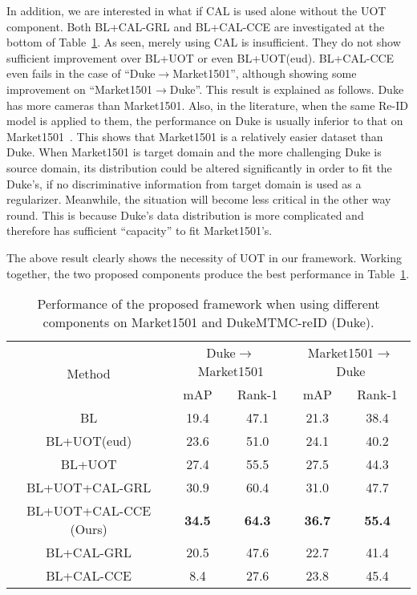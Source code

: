 \documentclass[10pt,twocolumn,letterpaper]{article}
\begin{document}
 
In addition, we are interested in what if CAL is used alone without the UOT component. Both BL+CAL-GRL and BL+CAL-CCE are investigated at the bottom of Table~\ref{tab02}. As seen, merely using CAL is insufficient. They do not show sufficient improvement over BL+UOT or even BL+UOT(eud). BL+CAL-CCE even fails in the case of ``Duke$\rightarrow$Market1501'', although showing some improvement on ``Market1501$\rightarrow$Duke''. This result is explained as follows. Duke has more cameras than Market1501. Also, in the literature, when the same Re-ID model is applied to them, the performance on Duke is usually inferior to that on Market1501~\cite{DBLP:conf/cvpr/LiZXW14,DBLP:conf/cvpr/AhmedJM15,DBLP:conf/iccv/ZhengZY17,kalayeh2018human}. This shows that Market1501 is a relatively easier dataset than Duke. When Market1501 is target domain and the more challenging Duke is source domain, its distribution could be altered significantly in order to fit the Duke's, if no discriminative information from target domain is used as a regularizer. Meanwhile, the situation will become less critical in the other way round. This is because Duke's data distribution is more complicated and therefore has sufficient ``capacity'' to fit Market1501's. 

The above result clearly shows the necessity of UOT in our framework. Working together, the two proposed components produce the best performance in Table~\ref{tab02}.   
 
 
 
\begin{table}[htbp]
 \centering
 \caption{Performance of the proposed framework when using different components on Market1501 and DukeMTMC-reID (Duke).}
 \begin{adjustbox}{width=0.48\textwidth}
   \begin{tabular}{|c|cc|cc|}
   \toprule
   \multirow{2}[1]{*}{Method} & \multicolumn{2}{c|}{Duke$\rightarrow$Market1501} & \multicolumn{2}{c|}{Market1501$\rightarrow$Duke} \\
\cmidrule{2-5}         & mAP  & Rank-1 & mAP  & Rank-1 \\
   \midrule
   BL & 19.4 & 47.1 & 21.3 & 38.4 \\
\midrule
   BL+UOT(eud) & 23.6 & 51.0 & 24.1 & 40.2 \\
   BL+UOT & 27.4 & 55.5 & 27.5 & 44.3 \\
   \midrule
   BL+UOT+CAL-GRL & 30.9 & 60.4 & 31.0 & 47.7 \\
   BL+UOT+CAL-CCE (Ours) & \textcolor[rgb]{ 1, 0, 0}{\textbf{34.5}} & \textcolor[rgb]{ 1, 0, 0}{\textbf{64.3}} & \textcolor[rgb]{ 1, 0, 0}{\textbf{36.7}} & \textcolor[rgb]{ 1, 0, 0}{\textbf{55.4}} \\
   \midrule
   \midrule
   BL+CAL-GRL & 20.5 & 47.6 & 22.7 & 41.4 \\
   BL+CAL-CCE & 8.4 & 27.6 & 23.8 & 45.4 \\
   \bottomrule
   \end{tabular}\end{adjustbox}
      \label{tab02}\vspace*{-15pt}
\end{table}
\end{document}

